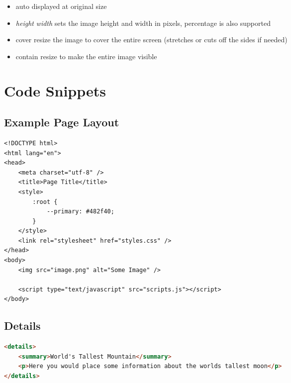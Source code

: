 \documentclass[12pt, a4paper]{article}
\begin{document}
\begin{multicols*}{2}
\begin{description}
			\begin{itemize}
				\item auto
				\subitem displayed at original size
				\item \textit{height} \textit{width}
				\subitem sets the image height and width in pixels, percentage is also supported
				\item cover
				\subitem resize the image to cover the entire screen (stretches or cuts off the sides if needed)
				\item contain
				\subitem resize to make the entire image visible
			\end{itemize}
		\end{description}
		
	\end{multicols*}
		
	\section{Code Snippets}

	\subsection{Example Page Layout}
	\begin{lstlisting}
<!DOCTYPE html>
<html lang="en">
<head>
	<meta charset="utf-8" />
	<title>Page Title</title>
	<style>
		:root {
			--primary: #482f40;
		}
	</style>
	<link rel="stylesheet" href="styles.css" />
</head>
<body>
	<img src="image.png" alt="Some Image" />

	<script type="text/javascript" src="scripts.js"></script>
</body>	
	\end{lstlisting}
	

	\subsection{Details}
	\begin{lstlisting}[language=html]
<details>
	<summary>World's Tallest Mountain</summary>
	<p>Here you would place some information about the worlds tallest moon</p>
</details>
	\end{lstlisting}
\end{document}

